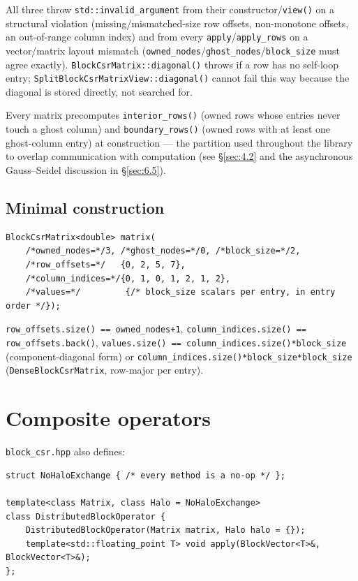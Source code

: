\documentclass[11pt,a4paper]{report}
\newcommand{\secref}[1]{\S\ref{#1}}
\begin{document}
All three throw \lstinline!std::invalid_argument! from their constructor/\lstinline!view()!
on a structural violation (missing/mismatched-size row offsets,
non-monotone offsets, an out-of-range column index) and from every
\lstinline!apply!/\lstinline!apply_rows! on a vector/matrix layout mismatch
(\lstinline!owned_nodes!/\lstinline!ghost_nodes!/\lstinline!block_size! must agree exactly).
\lstinline!BlockCsrMatrix::diagonal()! throws if a row has no self-loop entry;
\lstinline!SplitBlockCsrMatrixView::diagonal()! cannot fail this way because the
diagonal is stored directly, not searched for.

Every matrix precomputes \lstinline!interior_rows()! (owned rows whose entries
never touch a ghost column) and \lstinline!boundary_rows()! (owned rows with at
least one ghost-column entry) at construction --- the partition used
throughout the library to overlap communication with computation (see
\secref{sec:4.2} and the asynchronous Gauss--Seidel discussion in
\secref{sec:6.5}).

\subsection*{Minimal construction}
\begin{lstlisting}
BlockCsrMatrix<double> matrix(
    /*owned_nodes=*/3, /*ghost_nodes=*/0, /*block_size=*/2,
    /*row_offsets=*/   {0, 2, 5, 7},
    /*column_indices=*/{0, 1, 0, 1, 2, 1, 2},
    /*values=*/         {/* block_size scalars per entry, in entry order */});
\end{lstlisting}

\lstinline!row_offsets.size() == owned_nodes+1!, \lstinline!column_indices.size() == row_offsets.back()!,
\lstinline!values.size() == column_indices.size()*block_size! (component-diagonal
form) or \lstinline!column_indices.size()*block_size*block_size! (\lstinline!DenseBlockCsrMatrix!,
row-major per entry).

\section{Composite operators}
\label{sec:3.5}

\texttt{block\_csr.hpp} also defines:

\begin{lstlisting}
struct NoHaloExchange { /* every method is a no-op */ };

template<class Matrix, class Halo = NoHaloExchange>
class DistributedBlockOperator {
    DistributedBlockOperator(Matrix matrix, Halo halo = {});
    template<std::floating_point T> void apply(BlockVector<T>&, BlockVector<T>&);
};
\end{lstlisting}
\end{document}
